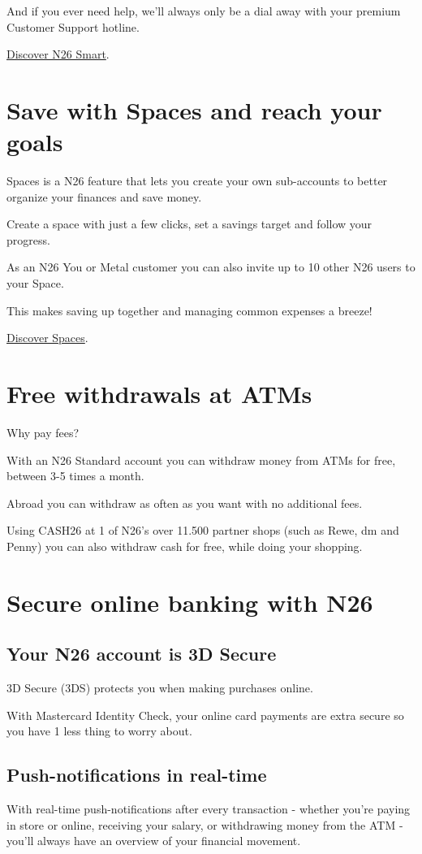 \documentclass[onsided]{book}
\numberwithin{equation}{section}
\begin{document}
And if you ever need help, we'll always only be a dial away with your premium Customer Support hotline.

\href{https://n26.com/en-de/bank-account}{Discover N26 Smart}.

\section{Save with Spaces and reach your goals}
Spaces is a N26 feature that lets you create your own sub-accounts to better organize your finances and save money.

Create a space with just a few clicks, set a savings target and follow your progress.

%
As an N26 You or Metal customer you can also invite up to 10 other N26 users to your Space.

This makes saving up together and managing common expenses a breeze!

\href{https://n26.com/en-de/spaces}{Discover Spaces}.

\section{Free withdrawals at ATMs}
Why pay fees?

With an N26 Standard account you can withdraw money from ATMs for free, between 3-5 times a month.

Abroad you can withdraw as often as you want with no additional fees.

Using CASH26 at 1 of N26's over 11.500 partner shops (such as Rewe, dm and Penny) you can also withdraw cash for free, while doing your shopping.

\section{Secure online banking with N26}

\subsection{Your N26 account is 3D Secure}
3D Secure (3DS) protects you when making purchases online.

With Mastercard Identity Check, your online card payments are extra secure so you have 1 less thing to worry about.

\subsection{Push-notifications in real-time}
With real-time push-notifications after every transaction - whether you're paying in store or online, receiving your salary, or withdrawing money from the ATM - you'll always have an overview of your financial movement.
\end{document}
